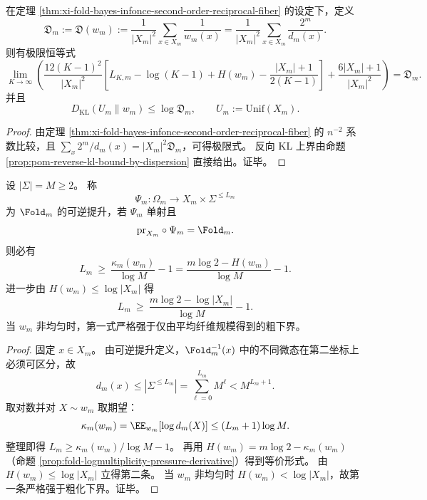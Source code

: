 \begin{corollary}[二阶曲率识别离散度指数与反向 KL 证书]\label{cor:xi-fold-infonce-second-order-curvature-dispersion}
在定理 \ref{thm:xi-fold-bayes-infonce-second-order-reciprocal-fiber} 的设定下，定义
\[
\mathfrak D_m:=\mathfrak D(w_m)
:=\frac{1}{|X_m|^2}\sum_{x\in X_m}\frac{1}{w_m(x)}
=\frac{1}{|X_m|^2}\sum_{x\in X_m}\frac{2^m}{d_m(x)}.
\]
则有极限恒等式
\[
\lim_{K\to\infty}\left(
\frac{12(K-1)^2}{|X_m|^2}
\left[
L_{K,m}-\log(K-1)+H(w_m)-\frac{|X_m|+1}{2(K-1)}
\right]
+\frac{6|X_m|+1}{|X_m|^2}
\right)=\mathfrak D_m.
\]
并且
\[
D_{\mathrm{KL}}(U_m\|w_m)\le \log \mathfrak D_m,
\qquad
U_m:=\mathrm{Unif}(X_m).
\]
\end{corollary}
\begin{proof}
由定理 \ref{thm:xi-fold-bayes-infonce-second-order-reciprocal-fiber} 的 \(n^{-2}\) 系数比较，且
\(
\sum_x 2^m/d_m(x)=|X_m|^2\mathfrak D_m
\)，可得极限式。
反向 KL 上界由命题 \ref{prop:pom-reverse-kl-bound-by-dispersion} 直接给出。证毕。
\end{proof}

\begin{theorem}[熵驱动的可逆提升长度下界]\label{thm:xi-fold-reversible-lift-length-lowerbound-kappa}
设 \(|\Sigma|=M\ge 2\)。
称
\[
\Psi_m:\Omega_m\to X_m\times\Sigma^{\le L_m}
\]
为 \(\Fold_m\) 的可逆提升，若 \(\Psi_m\) 单射且
\[
\mathrm{pr}_{X_m}\circ\Psi_m=\Fold_m.
\]
则必有
\[
L_m\ \ge\ \frac{\kappa_m(w_m)}{\log M}-1
=\frac{m\log 2-H(w_m)}{\log M}-1.
\]
进一步由 \(H(w_m)\le \log|X_m|\) 得
\[
L_m\ \ge\ \frac{m\log 2-\log|X_m|}{\log M}-1.
\]
当 \(w_m\) 非均匀时，第一式严格强于仅由平均纤维规模得到的粗下界。
\end{theorem}
\begin{proof}
固定 \(x\in X_m\)。
由可逆提升定义，\(\Fold_m^{-1}(x)\) 中的不同微态在第二坐标上必须可区分，故
\[
d_m(x)\le |\Sigma^{\le L_m}|=\sum_{\ell=0}^{L_m}M^\ell< M^{L_m+1}.
\]
取对数并对 \(X\sim w_m\) 取期望：
\[
\kappa_m(w_m)=\EE_{w_m}[\log d_m(X)]\le (L_m+1)\log M.
\]
整理即得
\(
L_m\ge \kappa_m(w_m)/\log M-1
\)。
再用 \(H(w_m)=m\log 2-\kappa_m(w_m)\)（命题 \ref{prop:fold-logmultiplicity-pressure-derivative}）得到等价形式。
由 \(H(w_m)\le \log|X_m|\) 立得第二条。
当 \(w_m\) 非均匀时 \(H(w_m)<\log|X_m|\)，故第一条严格强于粗化下界。证毕。
\end{proof}

